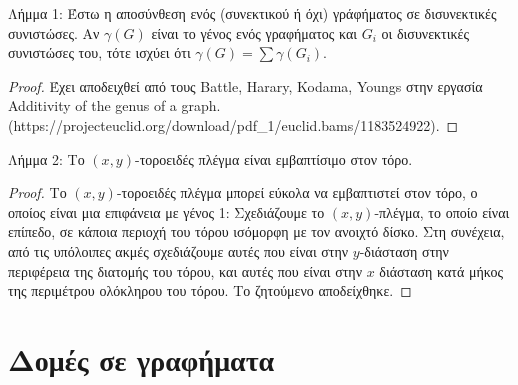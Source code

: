 \documentclass[a4paper, oneside, 11pt]{article}
\theoremstyle{definition}
\begin{document}
\begin{enumerate}
Λήμμα 1: Έστω η αποσύνθεση ενός (συνεκτικού ή όχι) γράφήματος σε δισυνεκτικές συνιστώσες. Αν $\gamma(G)$ είναι το γένος ενός γραφήματος και $G_i$ οι δισυνεκτικές συνιστώσες του, τότε ισχύει ότι
$\gamma(G) = \sum {\gamma(G_i)}$.

\begin{proof}
Έχει αποδειχθεί από τους Battle, Harary, Kodama, Youngs στην εργασία Additivity of the genus of a graph.
\newline (https://projecteuclid.org/download/pdf\_1/euclid.bams/1183524922).
\end{proof}

Λήμμα 2: Το $(x,y)$-τοροειδές πλέγμα είναι εμβαπτίσιμο στον τόρο.
\begin{proof}
Το $(x,y)$-τοροειδές πλέγμα μπορεί εύκολα να εμβαπτιστεί
στον τόρο, ο οποίος είναι μια επιφάνεια με γένος 1: Σχεδιάζουμε το $(x,y)$-πλέγμα, το οποίο είναι επίπεδο, σε κάποια περιοχή του τόρου ισόμορφη με τον ανοιχτό δίσκο. 
Στη συνέχεια, από τις υπόλοιπες ακμές σχεδιάζουμε αυτές που είναι 
στην $y$-διάσταση στην περιφέρεια της διατομής του τόρου, και αυτές που είναι στην $x$ διάσταση κατά μήκος της περιμέτρου ολόκληρου του τόρου.
Το ζητούμενο αποδείχθηκε.
\end{proof}

\end{enumerate}

\section{Δομές σε γραφήματα}
\end{document}
